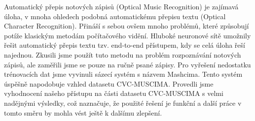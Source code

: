 \documentclass[12pt]{report}
\begin{document}

Automatický přepis notových zápisů (Optical Music Recognition) je zajímavá úloha, v mnoha ohledech podobná automatickému přepisu textu (Optical Character Recognition). Přináší s sebou ovšem mnoho problémů, které způsobují potíže klasickým metodám počítačového vidění. Hluboké neuronové sítě umožnily řešit automatický přepis textu tzv. end-to-end přístupem, kdy se celá úloha řeší najednou. Zkusili jsme použít tuto metodu na problém rozpoznávání notových zápisů, ale zaměřili jsme se pouze na ručně psané zápisy. Pro vyřešení nedostatku trénovacích dat jsme vyvinuli sázecí systém s názvem Mashcima. Tento systém úspěšně napodobuje vzhled datasetu CVC-MUSCIMA. Provedli jsme vyhodnocení našeho přístupu na části datasetu CVC-MUSCIMA s velmi nadějnými výsledky, což naznačuje, že použité řešení je funkční a další práce v tomto směru by mohla vést ještě k dalšímu zlepšení.
\end{document}
